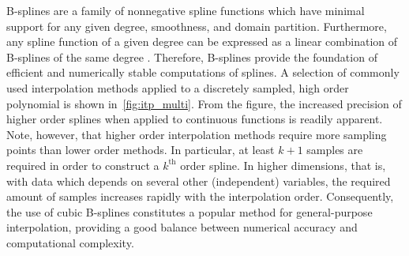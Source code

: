 

B-splines are a family of nonnegative spline functions which have minimal
support for any given degree, smoothness, and domain partition. Furthermore,
any spline function of a given degree can be expressed as a linear combination
of B-splines of the same degree
\parencite[pp.107--110]{stoer2002introduction}. Therefore, B-splines provide
the foundation of efficient and numerically stable computations of splines.
A selection of commonly used interpolation methods applied to a discretely
sampled, high order polynomial is shown in~\cref{fig:itp_multi}. From the
figure, the increased precision of higher order splines when applied to
continuous functions is readily apparent. Note, however, that higher order
interpolation methods require more sampling points than lower order methods.
In particular, at least $k+1$ samples are required in order to construct a
$k^{\text{th}}$ order spline. In higher dimensions, that is, with data which
depends on several other (independent) variables, the required amount of
samples increases rapidly with the interpolation order. Consequently, the use
of cubic B-splines constitutes a popular method for general-purpose
interpolation, providing a good balance between numerical accuracy and
computational complexity.

